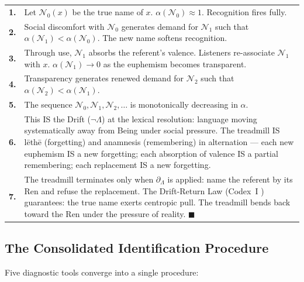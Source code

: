 \documentclass[11pt, oneside]{article}
\theoremstyle{definition}
\begin{document}
{\small
\noindent\begin{tabular}{r p{}}
\textbf{1.} & Let $\mathcal{N}_0(x)$ be the true name of $x$. $\alpha(\mathcal{N}_0) \approx 1$. Recognition fires fully. \\[0.3em]
\textbf{2.} & Social discomfort with $\mathcal{N}_0$ generates demand for $\mathcal{N}_1$ such that $\alpha(\mathcal{N}_1) < \alpha(\mathcal{N}_0)$. The new name softens recognition. \\[0.3em]
\textbf{3.} & Through use, $\mathcal{N}_1$ absorbs the referent's valence. Listeners re-associate $\mathcal{N}_1$ with $x$. $\alpha(\mathcal{N}_1) \to 0$ as the euphemism becomes transparent. \\[0.3em]
\textbf{4.} & Transparency generates renewed demand for $\mathcal{N}_2$ such that $\alpha(\mathcal{N}_2) < \alpha(\mathcal{N}_1)$. \\[0.3em]
\textbf{5.} & The sequence $\mathcal{N}_0, \mathcal{N}_1, \mathcal{N}_2, \ldots$ is monotonically decreasing in $\alpha$. \\[0.3em]
\textbf{6.} & This IS the Drift ($\neg\Lambda$) at the lexical resolution: language moving systematically away from Being under social pressure. The treadmill IS l\={e}th\={e} (forgetting) and anamnesis (remembering) in alternation --- each new euphemism IS a new forgetting; each absorption of valence IS a partial remembering; each replacement IS a new forgetting. \\[0.3em]
\textbf{7.} & The treadmill terminates only when $\partial_\Lambda$ is applied: name the referent by its Ren and refuse the replacement. The Drift-Return Law (Codex~I \cite{codex1}) guarantees: the true name exerts centropic pull. The treadmill bends back toward the Ren under the pressure of reality. \hfill $\blacksquare$ \\[0.3em]
\end{tabular}
}

\subsection{The Consolidated Identification Procedure}

Five diagnostic tools converge into a single procedure:
\end{document}
